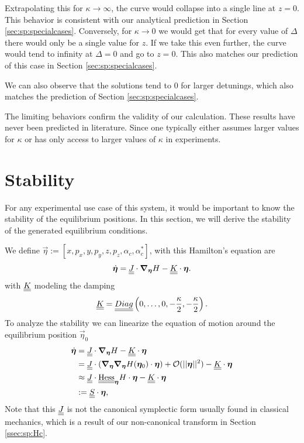 Extrapolating this for $\kappa \rightarrow \infty$, the curve would collapse into a single line at $z = 0$.
This behavior is consistent with our analytical prediction in Section \ref{sec:sp:specialcases}.
Conversely, for $\kappa \rightarrow 0$ we would get that for every value of $\Delta$ there would only be a single value for $z$.
If we take this even further, the curve would tend to infinity at $\Delta = 0$ 
    and go to $z = 0$.
This also matches our prediction of this case in Section \ref{sec:sp:specialcases}.

We can also observe that the solutions tend to $0$ for larger detunings,
    which also matches the prediction of Section \ref{sec:sp:specialcases}.

The limiting behaviors confirm the validity of our calculation.
These results have never been predicted in literature.
Since one typically either assumes larger values for $\kappa$
    or has only access to larger values of $\kappa$ in experiments.


\section{Stability}
\label{sec:sp:stability}

For any experimental use case of this system, it would be important to know the stability of the equilibrium positions.
In this section, we will derive the stability of the generated equilibrium conditions.

We define $\vec\eta := [x, p_x, y, p_y, z, p_z, \alpha_c, \alpha_c^*]$,
    with this Hamilton's equation are
    \begin{equation}
    \dot{\bm{\eta}} = \underline{\underline{J}} \cdot \bm{\nabla}_{\bm{\eta}} H - \underline{\underline{K}}\cdot \bm{\eta}.
    \end{equation}
with $\underline{\underline{K}}$ modeling the damping 
\begin{equation}
    \underline{\underline{K}} = \underline{\underline{Diag}}\left(0,\dots,0, -\frac\kappa2, -\frac\kappa2 \right).
\end{equation}
To analyze the stability we can linearize the equation of motion around the equilibrium position $\vec\eta_0$
\begin{align}
    \dot{\bm{\eta}} 
    &= \underline{\underline{J}} \cdot \bm{\nabla}_{\bm{\eta}} H - \underline{\underline{K}}\cdot \bm{\eta}\\
    &= \underline{\underline{J}} \cdot \left(  
        \bm{\nabla}_{\bm{\eta}}\bm{\nabla}_{\bm{\eta}}H(\bm{\eta}_0)  \cdot \bm{\eta}
    \right) + \mathcal{O}(||\bm{\eta}||^2) - \underline{\underline{K}}\cdot \bm{\eta} \\
    & \approx \underline{\underline{J}} \cdot \underline{\underline{\mathrm{Hess}}}_{\bm{\eta}} H \cdot \bm{\eta}- \underline{\underline{K}}\cdot \bm{\eta} \\
    & := \underline{\underline{S}} \cdot\bm{\eta},
\end{align}
Note that this $\underline{\underline{J}}$ is not the canonical symplectic form usually found in classical mechanics,
    which is a result of our non-canonical transform in Section \ref{ssec:sp:Hc}.

